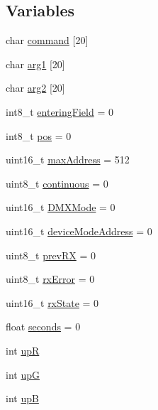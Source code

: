 \subsection*{Variables}
\begin{DoxyCompactItemize}
\item 
char \mbox{\hyperlink{satej__matthew_8c_ab36a1cdf1f08575764a5aa3691b93f6f}{command}} \mbox{[}20\mbox{]}
\item 
char \mbox{\hyperlink{satej__matthew_8c_accf689945fb0ed6303f1696f1171a053}{arg1}} \mbox{[}20\mbox{]}
\item 
char \mbox{\hyperlink{satej__matthew_8c_a31707e8b8c984ef710bfa2b7f63b0760}{arg2}} \mbox{[}20\mbox{]}
\item 
int8\+\_\+t \mbox{\hyperlink{satej__matthew_8c_a946da241f5739dded95e618792fa754a}{entering\+Field}} = 0
\item 
int8\+\_\+t \mbox{\hyperlink{satej__matthew_8c_a74d38abb1cb2f27f78ca059e24654b5e}{pos}} = 0
\item 
uint16\+\_\+t \mbox{\hyperlink{satej__matthew_8c_a00e6b200308fbb690bdc114e3ba5616b}{max\+Address}} = 512
\item 
uint8\+\_\+t \mbox{\hyperlink{satej__matthew_8c_ad9818a836c7c4d1d49d907c9fb916d83}{continuous}} = 0
\item 
uint16\+\_\+t \mbox{\hyperlink{satej__matthew_8c_a57f25f3dc6e734d597fcd5abacb04166}{D\+M\+X\+Mode}} = 0
\item 
uint16\+\_\+t \mbox{\hyperlink{satej__matthew_8c_aefd454f4f4d2d4dc52ea4a94145c0e93}{device\+Mode\+Address}} = 0
\item 
uint8\+\_\+t \mbox{\hyperlink{satej__matthew_8c_a568ff7da7fe7f4ceef3555f2465a3cc7}{prev\+RX}} = 0
\item 
uint8\+\_\+t \mbox{\hyperlink{satej__matthew_8c_a3b602f53c4c8ee9c5b185230f0ed4e2e}{rx\+Error}} = 0
\item 
uint16\+\_\+t \mbox{\hyperlink{satej__matthew_8c_a1270408cd1dbd2e41859adf94cb71e5d}{rx\+State}} = 0
\item 
float \mbox{\hyperlink{satej__matthew_8c_a70fc306096de2bed127c1afdc92bd30d}{seconds}} = 0
\item 
int \mbox{\hyperlink{satej__matthew_8c_aa676cd48f328c4eb0b19b54828466beb}{upR}}
\item 
int \mbox{\hyperlink{satej__matthew_8c_a5fd7e7401aceed949131c42599336c36}{upG}}
\item 
int \mbox{\hyperlink{satej__matthew_8c_a106fbf734fbb9c192880e1cd12f4a396}{upB}}
\item 

\end{DoxyCompactItemize}
